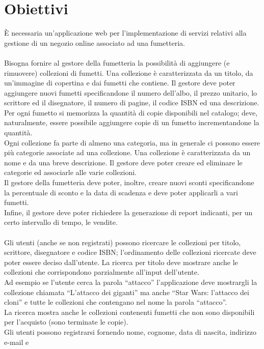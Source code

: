 \documentclass{scrreprt}
\begin{document}
\section{Obiettivi}\label{obiettivi}
È necessaria un’applicazione web per l’implementazione di servizi relativi alla
gestione di un negozio online associato ad una fumetteria.\\
\\
Bisogna fornire al gestore della fumetteria la possibilità di aggiungere (e rimuovere) collezioni
di fumetti. Una collezione è caratterizzata da un titolo, da un'immagine di copertina e dai fumetti che 
contiene. Il gestore deve poter aggiungere nuovi fumetti specificandone il numero dell'albo, il prezzo
unitario, lo scrittore ed il disegnatore, il numero di pagine, il codice ISBN ed una descrizione.
Per ogni fumetto si memorizza la quantità di copie disponibili nel catalogo; deve, naturalmente, essere
possibile aggiungere copie di un fumetto incrementandone la quantità.\\
Ogni collezione fa parte di almeno una categoria, ma in generale ci possono essere più categorie associate
ad una collezione. Una collezione è caratterizzata da un nome e da una breve descrizione. Il gestore deve
poter creare ed eliminare le categorie ed associarle alle varie collezioni.\\
Il gestore della fumetteria deve poter, inoltre, creare nuovi sconti specificandone la percentuale di sconto
e la data di scadenza e deve poter applicarli a vari fumetti.\\
Infine, il gestore deve poter richiedere la generazione di report indicanti, per un certo intervallo di tempo,
le vendite.\\
\\
Gli utenti (anche se non registrati) possono ricercare le collezioni per titolo, scrittore,
disegnatore e codice ISBN; l'ordinamento delle collezioni ricercate deve poter essere deciso 
dall'utente. La ricerca per titolo deve mostrare anche le collezioni che corrispondono parzialmente 
all’input dell’utente.\\ 
Ad esempio se l’utente cerca la parola “attacco” l’applicazione deve mostrargli la collezione
chiamata “L’attacco dei giganti” ma anche “Star Wars: l’attacco dei cloni” e tutte le collezioni 
che contengano nel nome la parola “attacco”.\\
La ricerca mostra anche le collezioni contenenti fumetti che non sono disponibili per l'acquisto
(sono terminate le copie).\\
Gli utenti possono registrarsi fornendo nome, cognome, data di nascita, indirizzo e-mail e
\end{document}
